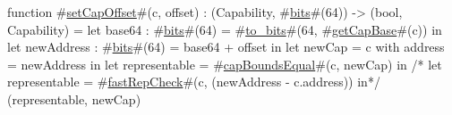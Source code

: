 function #\hyperref[sailMIPSzsetCapOffset]{setCapOffset}#(c, offset) : (Capability, #\hyperref[sailMIPSzbits]{bits}#(64)) -> (bool, Capability) =
    let base64 : #\hyperref[sailMIPSzbits]{bits}#(64) = #\hyperref[sailMIPSztozybits]{to\_bits}#(64, #\hyperref[sailMIPSzgetCapBase]{getCapBase}#(c)) in
    let newAddress : #\hyperref[sailMIPSzbits]{bits}#(64) = base64 + offset in
    let newCap     = { c with address = newAddress } in
    let representable = #\hyperref[sailMIPSzcapBoundsEqual]{capBoundsEqual}#(c, newCap) in
/*    let representable = #\hyperref[sailMIPSzfastRepCheck]{fastRepCheck}#(c, (newAddress - c.address)) in*/
    (representable, newCap)
